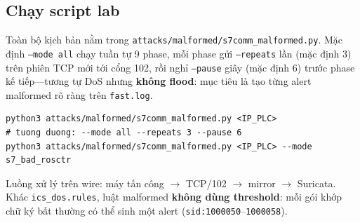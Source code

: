 \documentclass[../main.tex]{subfiles}
\begin{document}
\subsection{Chạy script lab}

Toàn bộ kịch bản nằm trong \texttt{attacks/malformed/s7comm\_malformed.py}. Mặc định \texttt{--mode all} chạy tuần tự 9 phase, mỗi phase gửi \texttt{--repeats} lần (mặc định 3) trên phiên TCP mới tới cổng 102, rồi nghỉ \texttt{--pause} giây (mặc định 6) trước phase kế tiếp---tương tự DoS nhưng \textbf{không flood}: mục tiêu là tạo từng alert malformed rõ ràng trên \texttt{fast.log}.

\begin{verbatim}
python3 attacks/malformed/s7comm_malformed.py <IP_PLC>
# tuong duong: --mode all --repeats 3 --pause 6
python3 attacks/malformed/s7comm_malformed.py <IP_PLC> --mode s7_bad_rosctr
\end{verbatim}

Luồng xử lý trên wire: máy tấn công $\rightarrow$ TCP/102 $\rightarrow$ mirror $\rightarrow$ Suricata. Khác \texttt{ics\_dos.rules}, luật malformed \textbf{không dùng threshold}: mỗi gói khớp chữ ký bất thường có thể sinh một alert (\texttt{sid:1000050}--\texttt{1000058}).
\end{document}
